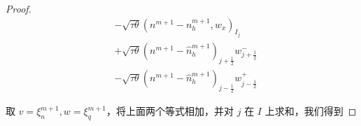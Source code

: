 \begin{proof}
$$\begin{aligned}
                                                                                                                                 & -\sqrt{\tau \theta}\left(n^{m+1}-n_{h}^{m+1}, w_{x}\right)_{I_{j}}                                                                                                      \\
                                                                                                                                 & +\sqrt{\tau \theta}\left(n^{m+1}-\hat{n}_{h}^{m+1}\right)_{j+\frac{1}{2}} w_{j+\frac{1}{2}}^{-}                                                                         \\
                                                                                                                                 & -\sqrt{\tau \theta}\left(n^{m+1}-\hat{n}_{h}^{m+1}\right)_{j-\frac{1}{2}} w_{j-\frac{1}{2}}^{+}
        \end{aligned}
    $$

    取 $v=\xi_{n}^{m+1}, w=\xi_{q}^{m+1}$，将上面两个等式相加，并对 $j$ 在 $I$ 上求和，我们得到


\end{proof}
